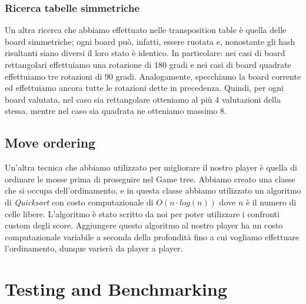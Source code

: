 \documentclass{article}
\begin{document}
\subsubsection{Ricerca tabelle simmetriche}
Un altra ricerca che abbiamo effettuato nelle transposition table è quella delle board simmetriche; ogni board può, infatti, essere ruotata e, nonostante gli hash risultanti siano diversi il loro stato è identico. In particolare: nei casi di board rettangolari effettuiamo una rotazione di 180 gradi e nei casi di board quadrate effettuiamo tre rotazioni di 90 gradi. Analogamente, specchiamo la board corrente ed effettuiamo ancora tutte le rotazioni dette in precedenza. Quindi, per ogni board valutata, nel caso sia rettangolare otteniamo al più 4 valutazioni della stessa, mentre nel caso sia quadrata ne otteniamo massimo 8.


\subsection{Move ordering}
Un'altra tecnica che abbiamo utilizzato per migliorare il nostro player è quella di ordinare le mosse prima di proseguire nel Game tree. Abbiamo creato una classe che si occupa dell'ordinamento, e in questa classe abbiamo utilizzato un algoritmo di \textit{Quicksort} con costo computazionale di $O(n\cdot log(n))$ dove $n$ è il numero di celle libere. L'algoritmo è stato scritto da noi per poter utilizzare i confronti custom degli score. Aggiungere questo algoritmo al nostro player ha un costo computazionale variabile a seconda della profondità fino a cui vogliamo effettuare l'ordinamento, dunque varierà da player a player.

\section{Testing and Benchmarking}
\end{document}
